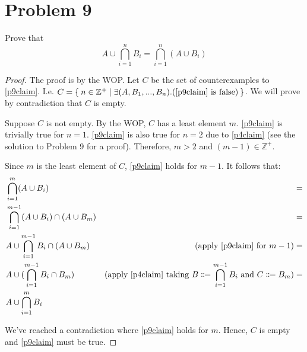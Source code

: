 \documentclass{article}
\begin{document}
\section{Problem 9}
Prove that
\begin{equation}\label{p9claim}
	A \cup \bigcap_{i=1}^n B_i = \bigcap_{i=1}^n (A \cup B_i)
\end{equation}
\begin{proof}
	The proof is by the WOP. Let $C$ be the set of counterexamples to \eqref{p9claim}. I.e. $C = \Set{n \in \mathbb{Z^+} | \exists (A,B_1,...,B_n).(\text{\eqref{p9claim} is false}) }$. We will prove by contradiction that $C$ is empty.

	Suppose $C$ is not empty. By the WOP, $C$ has a least element $m$. \eqref{p9claim} is trivially true for $n = 1$. \eqref{p9claim} is also true for $n = 2$ due to \eqref{p4claim} (see the solution to Problem 9 for a proof). Therefore, $m > 2$ and $(m - 1) \in \mathbb{Z^+}$.

	Since $m$ is the least element of $C$, \eqref{p9claim} holds for $m - 1$. It follows that:
	\begin{align*}
		 & \bigcap_{i=1}^m (A \cup B_i)                         &                                                                                                                    & = \\
		 & \bigcap_{i=1}^{m - 1} (A \cup B_i) \cap (A \cup B_m) &                                                                                                                    & = \\
		 & A \cup \bigcap_{i=1}^{m - 1} B_i \cap (A \cup B_m)   & (\text{apply } \eqref{p9claim} \text{ for } m - 1)                                                                 & = \\
		 & A \cup (\bigcap_{i=1}^{m - 1} B_i \cap B_m)          & (\text{apply } \eqref{p4claim} \text{ taking } B \Coloneqq \bigcap_{i=1}^{m - 1} B_i \text{ and } C \Coloneqq B_m) & = \\
		 & A \cup \bigcap_{i=1}^m B_i
	\end{align*}

	We've reached a contradiction where \eqref{p9claim} holds for $m$. Hence, $C$ is empty and \eqref{p9claim} must be true.
\end{proof}

\pagebreak
\end{document}
